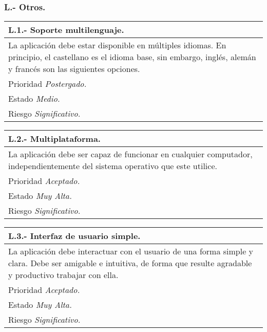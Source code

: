 \documentclass[a4paper,oneside,11pt]{book}
\begin{document}
\subsubsection{L.- Otros.}

\begin{center}
\begin{tabulary}{15cm}{|L|}
	\hline
		\bf{L.1.- Soporte multilenguaje.} \\
	\hline
		La aplicación debe estar disponible en múltiples idiomas. En principio, el castellano es el idioma base, sin embargo, inglés, alemán y francés son las siguientes opciones. \\
	\hline
		Prioridad \textit{Postergado.} \\
	\hline
		Estado \textit{Medio.} \\
	\hline
		Riesgo \textit{Significativo.} \\
	\hline
\end{tabulary}
\end{center}

\begin{center}
\begin{tabulary}{15cm}{|L|}
	\hline
		\bf{L.2.- Multiplataforma.} \\
	\hline
		La aplicación debe ser capaz de funcionar en cualquier computador, independientemente del sistema operativo que este utilice. \\
	\hline
		Prioridad \textit{Aceptado.} \\
	\hline
		Estado \textit{Muy Alta.} \\
	\hline
		Riesgo \textit{Significativo.} \\
	\hline
\end{tabulary}
\end{center}

\begin{center}
\begin{tabulary}{15cm}{|L|}
	\hline
		\bf{L.3.- Interfaz de usuario simple.} \\
	\hline
		La aplicación debe interactuar con el usuario de una forma simple y clara. Debe ser amigable e intuitiva, de forma que resulte agradable y productivo trabajar con ella. \\
	\hline
		Prioridad \textit{Aceptado.} \\
	\hline
		Estado \textit{Muy Alta.} \\
	\hline
		Riesgo \textit{Significativo.} \\
	\hline
\end{tabulary}
\end{center}
\end{document}
